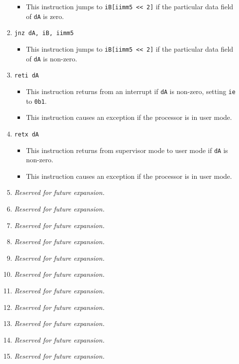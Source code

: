 \documentclass{article}
\begin{document}
\begin{itemize}
\begin{enumerate}
				\begin{itemize}
				\item This instruction jumps to \texttt{iB[iimm5 << 2]}
					if the particular data field of \texttt{dA} is zero.
				\end{itemize}
			\item \texttt{jnz dA, iB, iimm5}
				\begin{itemize}
				\item This instruction jumps to \texttt{iB[iimm5 << 2]}
					if the particular data field of \texttt{dA} is
					non-zero.
				\end{itemize}
			\item \texttt{reti dA}
				\begin{itemize}
				\item This instruction returns from an interrupt if
					\texttt{dA} is non-zero, setting \texttt{ie} to
					\texttt{0b1}.
				\item This instruction causes an exception if the processor
					is in user mode.
				\end{itemize}

			\item \texttt{retx dA}
				\begin{itemize}
				\item This instruction returns from supervisor mode to user
					mode if \texttt{dA} is non-zero.
				\item This instruction causes an exception if the processor
					is in user mode.
				\end{itemize}
			\item \textit{Reserved for future expansion.}
			\item \textit{Reserved for future expansion.}
			\item \textit{Reserved for future expansion.}

			\item \textit{Reserved for future expansion.}
			\item \textit{Reserved for future expansion.}
			\item \textit{Reserved for future expansion.}
			\item \textit{Reserved for future expansion.}

			\item \textit{Reserved for future expansion.}
			\item \textit{Reserved for future expansion.}
			\item \textit{Reserved for future expansion.}
			\item \textit{Reserved for future expansion.}
			\end{enumerate}
		\end{itemize}
		\newpage
\end{document}
